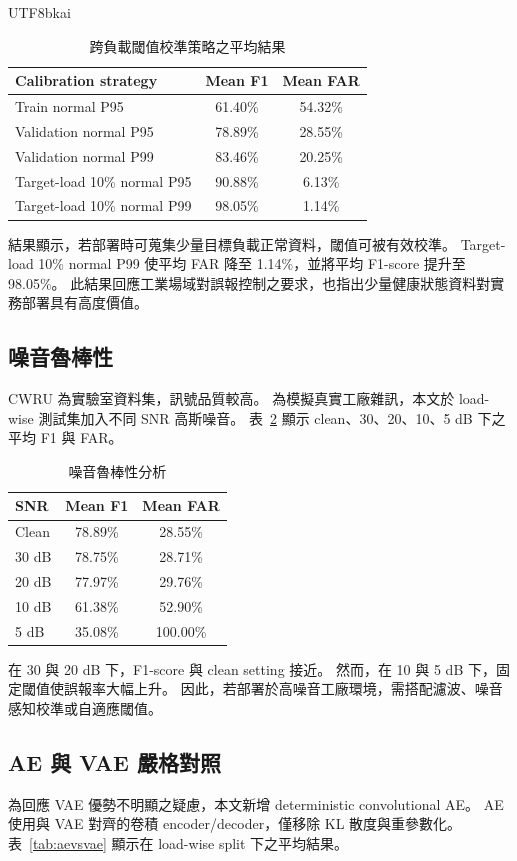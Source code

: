 \documentclass[conference]{IEEEtran}
\begin{document}
\begin{CJK}{UTF8}{bkai}
\begin{table}[ht]
\centering
\caption{跨負載閾值校準策略之平均結果}
\label{tab:calibration}
\begin{tabular}{lcc}
\toprule
\textbf{Calibration strategy} & \textbf{Mean F1} & \textbf{Mean FAR} \\
\midrule
Train normal P95 & 61.40\% & 54.32\% \\
Validation normal P95 & 78.89\% & 28.55\% \\
Validation normal P99 & 83.46\% & 20.25\% \\
Target-load 10\% normal P95 & 90.88\% & 6.13\% \\
Target-load 10\% normal P99 & 98.05\% & 1.14\% \\
\bottomrule
\end{tabular}
\end{table}

結果顯示，若部署時可蒐集少量目標負載正常資料，閾值可被有效校準。
Target-load 10\% normal P99 使平均 FAR 降至 1.14\%，並將平均 F1-score 提升至 98.05\%。
此結果回應工業場域對誤報控制之要求，也指出少量健康狀態資料對實務部署具有高度價值。

\subsection{噪音魯棒性}
CWRU 為實驗室資料集，訊號品質較高。
為模擬真實工廠雜訊，本文於 load-wise 測試集加入不同 SNR 高斯噪音。
表~\ref{tab:noise} 顯示 clean、30、20、10、5 dB 下之平均 F1 與 FAR。

\begin{table}[ht]
\centering
\caption{噪音魯棒性分析}
\label{tab:noise}
\begin{tabular}{lcc}
\toprule
\textbf{SNR} & \textbf{Mean F1} & \textbf{Mean FAR} \\
\midrule
Clean & 78.89\% & 28.55\% \\
30 dB & 78.75\% & 28.71\% \\
20 dB & 77.97\% & 29.76\% \\
10 dB & 61.38\% & 52.90\% \\
5 dB & 35.08\% & 100.00\% \\
\bottomrule
\end{tabular}
\end{table}

在 30 與 20 dB 下，F1-score 與 clean setting 接近。
然而，在 10 與 5 dB 下，固定閾值使誤報率大幅上升。
因此，若部署於高噪音工廠環境，需搭配濾波、噪音感知校準或自適應閾值。

\subsection{AE 與 VAE 嚴格對照}
為回應 VAE 優勢不明顯之疑慮，本文新增 deterministic convolutional AE。
AE 使用與 VAE 對齊的卷積 encoder/decoder，僅移除 KL 散度與重參數化。
表~\ref{tab:aevsvae} 顯示在 load-wise split 下之平均結果。


\end{CJK}
\end{document}

